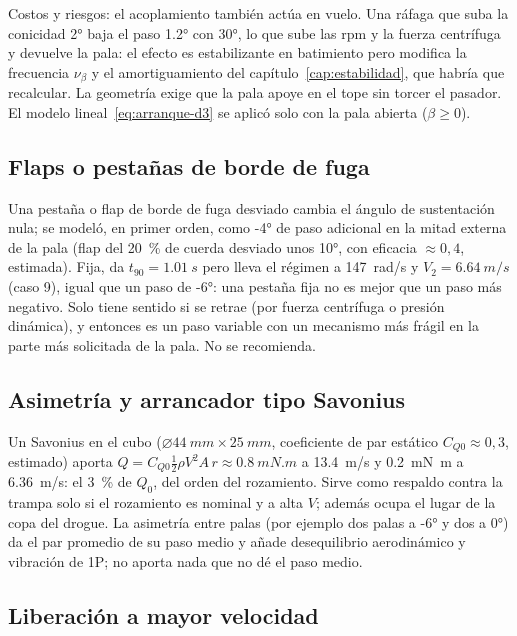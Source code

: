 Costos y riesgos: el acoplamiento también actúa en vuelo. Una ráfaga que suba la conicidad
\ang{2} baja el paso \ang{1.2} con \ang{30}, lo que sube las rpm y la fuerza centrífuga y
devuelve la pala: el efecto es estabilizante en batimiento pero modifica la frecuencia
$\nu_\beta$ y el amortiguamiento del capítulo~\ref{cap:estabilidad}, que habría que
recalcular. La geometría exige que la pala apoye en el tope sin torcer el pasador. El modelo
lineal~\eqref{eq:arranque-d3} se aplicó solo con la pala abierta ($\beta\ge0$).

\subsection{Flaps o pestañas de borde de fuga}

Una pestaña o flap de borde de fuga desviado cambia el ángulo de sustentación nula; se
modeló, en primer orden, como \ang{-4} de paso adicional en la mitad externa de la pala
(flap del \SI{20}{\percent} de cuerda desviado unos \ang{10}, con eficacia
$\approx0{,}4$, estimada). Fija, da $t_{90}=\SI{1.01}{s}$ pero lleva el régimen a
\SI{147}{rad/s} y $V_2=\SI{6.64}{m/s}$ (caso 9), igual que un paso de \ang{-6}: una pestaña
fija no es mejor que un paso más negativo. Solo tiene sentido si se retrae (por fuerza
centrífuga o presión dinámica), y entonces es un paso variable con un mecanismo más frágil
en la parte más solicitada de la pala. No se recomienda.

\subsection{Asimetría y arrancador tipo Savonius}

Un Savonius en el cubo ($\varnothing\SI{44}{mm}\times\SI{25}{mm}$, coeficiente de par
estático $C_{Q0}\approx0{,}3$, estimado) aporta
$Q=C_{Q0}\tfrac12\rho V^2 A\,r\approx\SI{0.8}{mN.m}$ a \SI{13.4}{m/s} y
\SI{0.2}{mN.m} a \SI{6.36}{m/s}: el \SI{3}{\percent} de $Q_0$, del orden del rozamiento. Sirve
como respaldo contra la trampa solo si el rozamiento es nominal y a alta $V$; además ocupa el
lugar de la copa del drogue. La asimetría entre palas (por ejemplo dos palas a \ang{-6} y dos
a \ang{0}) da el par promedio de su paso medio y añade desequilibrio aerodinámico y vibración
de 1P; no aporta nada que no dé el paso medio.

\subsection{Liberación a mayor velocidad}

